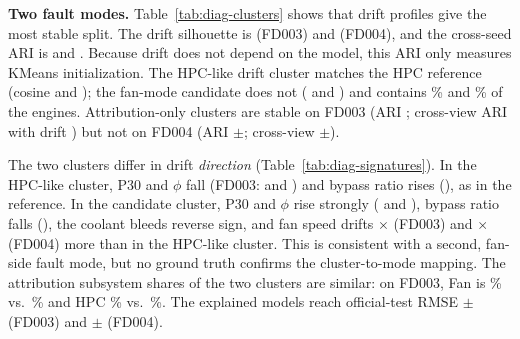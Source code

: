 \textbf{Two fault modes.} Table~\ref{tab:diag-clusters} shows that drift profiles give the most stable split. The drift silhouette is \DiagFdThreeDriftSil{} (FD003) and \DiagFdFourDriftSil{} (FD004), and the cross-seed ARI is \DiagFdThreeDriftSeedAri{} and \DiagFdFourDriftSeedAri{}. Because drift does not depend on the model, this ARI only measures KMeans initialization. The HPC-like drift cluster matches the HPC reference (cosine \DiagFdThreeDriftCosHpc{} and \DiagFdFourDriftCosHpc{}); the fan-mode candidate does not (\DiagFdThreeDriftCosFan{} and \DiagFdFourDriftCosFan{}) and contains \DiagFdThreeDriftFanFrac{}\% and \DiagFdFourDriftFanFrac{}\% of the engines. Attribution-only clusters are stable on FD003 (ARI \DiagFdThreeAttrSeedAri{}; cross-view ARI with drift \DiagFdThreeCrossViewAri{}) but not on FD004 (ARI \DiagFdFourAttrSeedAri{}$\pm$\DiagFdFourAttrSeedAriStd{}; cross-view \DiagFdFourCrossViewAri{}$\pm$\DiagFdFourCrossViewAriStd{}).

\begin{table}[t]
\centering
\caption{Mean signed end-of-life drift $z$ of key sensors for the label-free HPC reference (ref.), the HPC-like cluster (HPC-l.) and the fan-mode candidate (cand.) of the drift clustering, with each cluster's mean attribution subsystem share. The largest sample std of these drift values across seeds is \DiagSignatureMaxStd{}.}
\label{tab:diag-signatures}
\footnotesize
\setlength{\tabcolsep}{3.5pt}

\end{table}

The two clusters differ in drift \emph{direction} (Table~\ref{tab:diag-signatures}). In the HPC-like cluster, P30 and $\phi$ fall (FD003: \DiagFdThreeHpcZPThirty{} and \DiagFdThreeHpcZPhi{}) and bypass ratio rises (\DiagFdThreeHpcZBpr{}), as in the reference. In the candidate cluster, P30 and $\phi$ rise strongly (\DiagFdThreeCandZPThirty{} and \DiagFdThreeCandZPhi{}), bypass ratio falls (\DiagFdThreeCandZBpr{}), the coolant bleeds reverse sign, and fan speed drifts \DiagFdThreeFanSpeedRatio{}$\times$ (FD003) and \DiagFdFourFanSpeedRatio{}$\times$ (FD004) more than in the HPC-like cluster. This is consistent with a second, fan-side fault mode, but no ground truth confirms the cluster-to-mode mapping. The attribution subsystem shares of the two clusters are similar: on FD003, Fan is \DiagFdThreeHpcShareFan{}\% vs.\ \DiagFdThreeCandShareFan{}\% and HPC \DiagFdThreeHpcShareHpc{}\% vs.\ \DiagFdThreeCandShareHpc{}\%. The explained models reach official-test RMSE \DiagFdThreeRmse{}$\pm$\DiagFdThreeRmseStd{} (FD003) and \DiagFdFourRmse{}$\pm$\DiagFdFourRmseStd{} (FD004).

